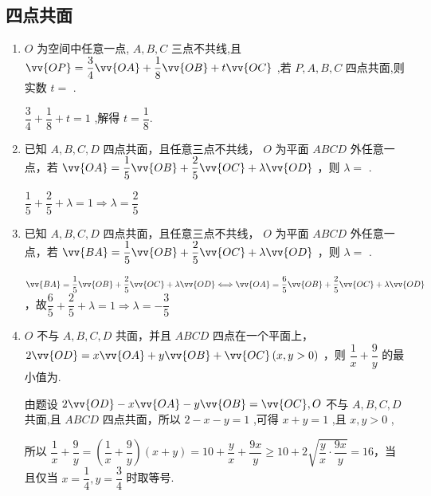 \subsection*{四点共面}
\begin{enumerate}
    \item $O$ 为空间中任意一点, $A,B,C$ 三点不共线,且 $\vv{OP} = \dfrac{3}{4}\vv{OA} + \dfrac{1}{8}\vv{OB} + t\vv{OC}$ ,若 $P,A,B,C$ 四点共面,则实数 $t =$ .
    \begin{jieda}
        $\dfrac{3}{4} + \dfrac{1}{8} + t = 1$ ,解得 $t = \dfrac{1}{8}$.
    \end{jieda}
    
    \item 已知 $A,B,C,D$ 四点共面，且任意三点不共线， $O$ 为平面 ${ABCD}$ 外任意一点，若 $\vv{OA} = \dfrac{1}{5}\vv{OB} + \dfrac{2}{5}\vv{OC} + \lambda \vv{OD}$ ，则 $\lambda  =$ .
    \begin{jieda}
        $\dfrac{1}{5} + \dfrac{2}{5} + \lambda  = 1 \Longrightarrow  \lambda  = \dfrac{2}{5}$
    \end{jieda}

    \item 已知 $A,B,C,D$ 四点共面，且任意三点不共线， $O$ 为平面 ${ABCD}$ 外任意一点，若 $\vv{BA} = \dfrac{1}{5}\vv{OB} + \dfrac{2}{5}\vv{OC} + \lambda \vv{OD}$ ，则 $\lambda  =$ .
    \begin{jieda}
        $\vv{BA} = \dfrac{1}{5}\vv{OB} + \dfrac{2}{5}\vv{OC} + \lambda \vv{OD} \Longleftrightarrow \vv{OA} = \dfrac{6}{5}\vv{OB} + \dfrac{2}{5}\vv{OC} + \lambda \vv{OD}$，故$\dfrac{6}{5} + \dfrac{2}{5} + \lambda  = 1 \Longrightarrow  \lambda  = -\dfrac{3}{5}$
    \end{jieda}
    
    \item $O$ 不与 $A,B,C,D$ 共面，并且 ${ABCD}$ 四点在一个平面上， $2\vv{OD} = x\vv{OA} + y\vv{OB} + \vv{OC}\left( {x,y > 0}\right)$ ，则 $\dfrac{1}{x} + \dfrac{9}{y}$ 的最小值为.
    \begin{jieda}
        由题设 $2\vv{OD} - x\vv{OA} - y\vv{OB} = \vv{OC},O$ 不与 $A,B,C,D$ 共面,且 ${ABCD}$ 四点共面，所以 $2 - x - y = 1$ ,可得 $x + y = 1$ ,且 $x,y > 0$ ,

        所以 $\dfrac{1}{x} + \dfrac{9}{y} = \left( {\dfrac{1}{x} + \dfrac{9}{y}}\right) \left( {x + y}\right)  = {10} + \dfrac{y}{x} + \dfrac{9x}{y} \geq  {10} + 2\sqrt{\dfrac{y}{x} \cdot  \dfrac{9x}{y}} = {16}$，当且仅当 $x = \dfrac{1}{4},y = \dfrac{3}{4}$ 时取等号.
    \end{jieda}


\end{enumerate}

